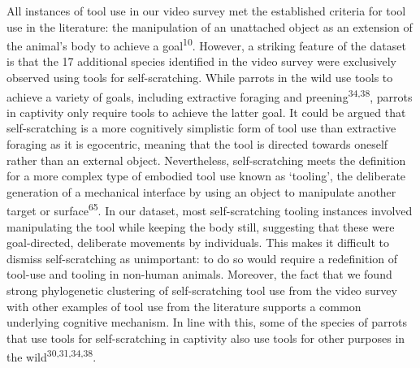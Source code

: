 \documentclass[
  man, donotrepeattitle,floatsintext]{apa6}
\begin{document}
All instances of tool use in our video survey met the established criteria for
tool use in the literature: the manipulation of an unattached object as an
extension of the animal's body to achieve a goal\textsuperscript{10}. However, a
striking feature of the dataset is that the 17 additional species identified in
the video survey were exclusively observed using tools for self-scratching.
While parrots in the wild use tools to achieve a variety of goals, including
extractive foraging and preening\textsuperscript{34,38}, parrots in captivity
only require tools to achieve the latter goal. It could be argued that
self-scratching is a more cognitively simplistic form of tool use than
extractive foraging as it is egocentric, meaning that the tool is directed
towards oneself rather than an external object. Nevertheless, self-scratching
meets the definition for a more complex type of embodied tool use known as
`tooling', the deliberate generation of a mechanical interface by using an
object to manipulate another target or surface\textsuperscript{65}. In our dataset,
most self-scratching tooling instances involved manipulating the tool while
keeping the body still, suggesting that these were goal-directed, deliberate
movements by individuals. This makes it difficult to dismiss self-scratching as
unimportant: to do so would require a redefinition of tool-use and tooling in
non-human animals. Moreover, the fact that we found strong phylogenetic
clustering of self-scratching tool use from the video survey with other examples
of tool use from the literature supports a common underlying cognitive
mechanism. In line with this, some of the species of parrots that use tools for
self-scratching in captivity also use tools for other purposes in the wild\textsuperscript{30,31,34,38}.
\end{document}
